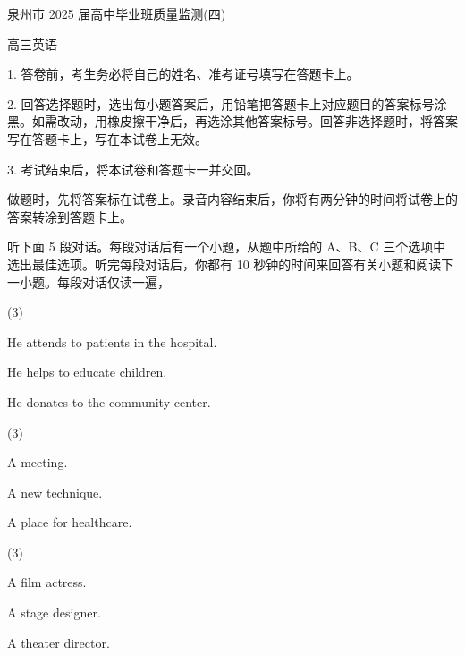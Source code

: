 \documentclass{英语试卷}
\begin{document}
\par 泉州市 2025 届高中毕业班质量监测(四)\par
\par 高三英语\par
\begin{notice}
\par 1. 答卷前，考生务必将自己的姓名、准考证号填写在答题卡上。\par
\par 2. 回答选择题时，选出每小题答案后，用铅笔把答题卡上对应题目的答案标号涂黑。如需改动，用橡皮擦干净后，再选涂其他答案标号。回答非选择题时，将答案写在答题卡上，写在本试卷上无效。\par
\par 3. 考试结束后，将本试卷和答题卡一并交回。\par
\end{notice}
\par 做题时，先将答案标在试卷上。录音内容结束后，你将有两分钟的时间将试卷上的答案转涂到答题卡上。\par
{}
\par 听下面 5 段对话。每段对话后有一个小题，从题中所给的 A、B、C 三个选项中选出最佳选项。听完每段对话后，你都有 10 秒钟的时间来回答有关小题和阅读下一小题。每段对话仅读一遍，\par
{}
\begin{choices}(3)
  \item He attends to patients in the hospital.
  \item He helps to educate children.
  \item He donates to the community center.
\end{choices}
\begin{choices}(3)
  \item A meeting.
  \item A new technique.
  \item A place for healthcare.
\end{choices}
\begin{choices}(3)
  \item A film actress.
  \item A stage designer.
  \item A theater director.
\end{choices}
\end{document}
